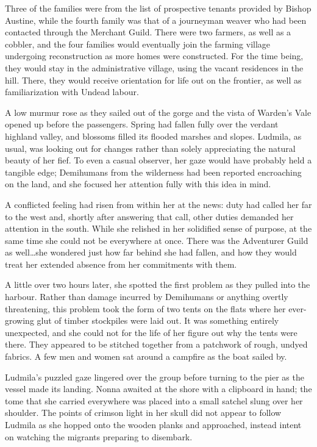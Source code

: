  

Three of the families were from the list of prospective tenants provided by Bishop Austine, while the fourth family was that of a journeyman weaver who had been contacted through the Merchant Guild. There were two farmers, as well as a cobbler, and the four families would eventually join the farming village undergoing reconstruction as more homes were constructed. For the time being, they would stay in the administrative village, using the vacant residences in the hill. There, they would receive orientation for life out on the frontier, as well as familiarization with Undead labour.

 

A low murmur rose as they sailed out of the gorge and the vista of Warden’s Vale opened up before the passengers. Spring had fallen fully over the verdant highland valley, and blossoms filled its flooded marshes and slopes. Ludmila, as usual, was looking out for changes rather than solely appreciating the natural beauty of her fief. To even a casual observer, her gaze would have probably held a tangible edge; Demihumans from the wilderness had been reported encroaching on the land, and she focused her attention fully with this idea in mind.

 

A conflicted feeling had risen from within her at the news: duty had called her far to the west and, shortly after answering that call, other duties demanded her attention in the south. While she relished in her solidified sense of purpose, at the same time she could not be everywhere at once. There was the Adventurer Guild as well…she wondered just how far behind she had fallen, and how they would treat her extended absence from her commitments with them.

 

A little over two hours later, she spotted the first problem as they pulled into the harbour. Rather than damage incurred by Demihumans or anything overtly threatening, this problem took the form of two tents on the flats where her ever-growing glut of timber stockpiles were laid out. It was something entirely unexpected, and she could not for the life of her figure out why the tents were there. They appeared to be stitched together from a patchwork of rough, undyed fabrics. A few men and women sat around a campfire as the boat sailed by.

 

Ludmila’s puzzled gaze lingered over the group before turning to the pier as the vessel made its landing. Nonna awaited at the shore with a clipboard in hand; the tome that she carried everywhere was placed into a small satchel slung over her shoulder. The points of crimson light in her skull did not appear to follow Ludmila as she hopped onto the wooden planks and approached, instead intent on watching the migrants preparing to disembark.

